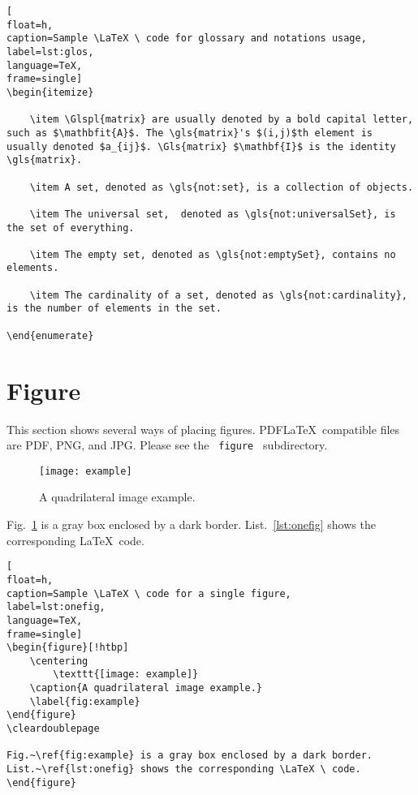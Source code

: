 \begin{lstlisting}[
float=h,
caption=Sample \LaTeX \ code for glossary and notations usage, 
label=lst:glos,
language=TeX,
frame=single]
\begin{itemize}

	\item \Glspl{matrix} are usually denoted by a bold capital letter, such as $\mathbfit{A}$. The \gls{matrix}'s $(i,j)$th element is usually denoted $a_{ij}$. \Gls{matrix} $\mathbf{I}$ is the identity \gls{matrix}.

	\item A set, denoted as \gls{not:set}, is a collection of objects.

	\item The universal set,  denoted as \gls{not:universalSet}, is the set of everything.

	\item The empty set, denoted as \gls{not:emptySet}, contains no elements.

	\item The cardinality of a set, denoted as \gls{not:cardinality}, is the number of elements in the set.

\end{enumerate}
\end{lstlisting}
\cleardoublepage












\newpage
\section{Figure}

This section shows several ways of placing figures.  PDF\LaTeX \ compatible files are PDF, PNG, and JPG.  Please see the \verb| figure | subdirectory.

\begin{figure}[!htbp]
	\centering
		\texttt{[image: example]}
	\caption{A quadrilateral image example.}
	\label{fig:example}
\end{figure}
\cleardoublepage

Fig.~\ref{fig:example} is a gray box enclosed by a dark border. List.~\ref{lst:onefig} shows the corresponding \LaTeX \ code. 


\begin{lstlisting}[
float=h,
caption=Sample \LaTeX \ code for a single figure, 
label=lst:onefig,
language=TeX,
frame=single]
\begin{figure}[!htbp]
	\centering
		\texttt{[image: example]}
	\caption{A quadrilateral image example.}
	\label{fig:example}
\end{figure}
\cleardoublepage

Fig.~\ref{fig:example} is a gray box enclosed by a dark border. List.~\ref{lst:onefig} shows the corresponding \LaTeX \ code. 	
\end{figure}
\end{lstlisting}
\cleardoublepage






